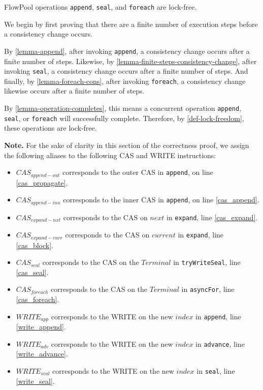 \documentclass[runningheads,a4paper]{llncs}
\begin{document}
\begin{theorem}\label{theorem-lock-freedom}
FlowPool operations \verb=append=, \verb=seal=, and \verb=foreach= are lock-free.

We begin by first proving that there are a finite number of execution steps
before a consistency change occurs.

By \ref{lemma-append}, after invoking \verb=append=, a consistency
change occurs after a finite number of steps. Likewise, by 
\ref{lemma-finite-steps-consistency-change}, after invoking \verb=seal=, a consistency
change occurs after a finite number of steps. And finally, by
\ref{lemma-foreach-cons},
after invoking \verb=foreach=, a consistency change likewise
occurs after a finite number of steps.

By \ref{lemma-operation-completes}, this means a concurrent operation
\verb=append=, \verb=seal=, or \verb=foreach= will successfully complete.
Therefore, by \ref{def-lock-freedom},  these operations are lock-free.

\end{theorem}


\noindent \textbf{Note.} For the sake of clarity in this section of the
correctness proof, we assign the following aliases to the following CAS and
WRITE instructions:

\begin{itemize}
\setlength{\itemindent}{-1em}
\item $CAS_{append-out}$ corresponds to the outer CAS in \verb=append=, on line \ref{cas_propagate}.
\item $CAS_{append-inn}$ corresponds to the inner CAS in \verb=append=, on line \ref{cas_append}.
\item $CAS_{expand-nxt}$ corresponds to the CAS on $next$ in \verb=expand=, line \ref{cas_expand}.
\item $CAS_{expand-curr}$ corresponds to the CAS on $current$ in \verb=expand=, line \ref{cas_block}.
\item $CAS_{seal}$ corresponds to the CAS on the $Terminal$ in \verb=tryWriteSeal=, line \ref{cas_seal}.
\item $CAS_{foreach}$ corresponds to the CAS on the $Terminal$ in \verb=asyncFor=, line \ref{cas_foreach}.
\item $WRITE_{app}$ corresponds to the WRITE on the new $index$ in \verb=append=, line \ref{write_append}.
\item $WRITE_{adv}$ corresponds to the WRITE on the new $index$ in \verb=advance=, line \ref{write_advance}.
\item $WRITE_{seal}$ corresponds to the WRITE on the new $index$ in \verb=seal=, line \ref{write_seal}.
\end{itemize}
\end{document}
